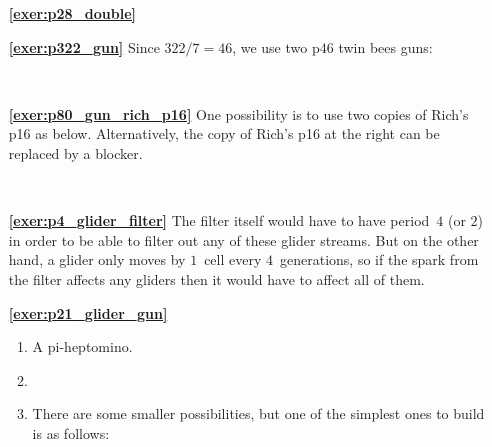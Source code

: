 \begin{multicols}{2}
	\begin{itemize}[leftmargin=0em]
		\item[\bf\color{ocre}\sffamily\ref{exer:p28_double}] \\[0.6em]
		
		
		\item[\bf\color{ocre}\sffamily\ref{exer:p322_gun}] Since $322/7 = 46$, we use two p$46$ twin bees guns:
		\begin{center}
			\\
		\end{center}
	
	
		\vspace*{4.6cm}
		
		
		\item[\bf\color{ocre}\sffamily\ref{exer:p80_gun_rich_p16}] One possibility is to use two copies of Rich's p16 as below. Alternatively, the copy of Rich's p16 at the right can be replaced by a blocker.
		\begin{center}
			\\
		\end{center}
		
		
		\item[\bf\color{ocre}\sffamily\ref{exer:p4_glider_filter}] The filter itself would have to have period~$4$ (or $2$) in order to be able to filter out any of these glider streams. But on the other hand, a glider only moves by $1$~cell every $4$~generations, so if the spark from the filter affects any gliders then it would have to affect all of them.\\
		
		
		\clearpage
		
		
		\item[\bf\color{ocre}\sffamily\ref{exer:p21_glider_gun}] \begin{enumerate}[leftmargin=1.5em,label=\bf\color{ocre}(\alph*)]
			\item A pi-heptomino.
			
			\item {} \\
			
			\item There are some smaller possibilities, but one of the simplest ones to build is as follows:
			\begin{center}
				\\[1cm]
			\end{center}
		

\end{enumerate}
\end{itemize}
\end{multicols}
